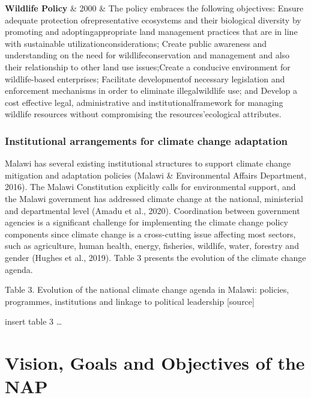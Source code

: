 \documentclass[
]{book}
\begin{document}
\begin{longtable}[]
\textbf{Wildlife Policy} & 2000 & The policy embraces the following objectives: Ensure adequate protection ofrepresentative ecosystems and their biological diversity by promoting and adoptingappropriate land management practices that are in line with sustainable utilizationconsiderations; Create public awareness and understanding on the need for wildlifeconservation and management and also their relationship to other land use issues;Create a conducive environment for wildlife-based enterprises; Facilitate developmentof necessary legislation and enforcement mechanisms in order to eliminate illegalwildlife use; and Develop a cost effective legal, administrative and institutionalframework for managing wildlife resources without compromising the resources'ecological attributes. \\
\bottomrule
\end{longtable}

\hypertarget{institutional-arrangements-for-climate-change-adaptation}{%
\subsection{Institutional arrangements for climate change adaptation}\label{institutional-arrangements-for-climate-change-adaptation}}

Malawi has several existing institutional structures to support climate change mitigation and adaptation policies (Malawi \& Environmental Affairs Department,
2016). The Malawi Constitution explicitly calls for environmental support, and the Malawi government has addressed climate change at the national, ministerial
and departmental level (Amadu et al., 2020). Coordination between government agencies is a significant challenge for implementing the climate change policy
components since climate change is a cross-cutting issue affecting most sectors, such as agriculture, human health, energy, fisheries, wildlife, water, forestry
and gender (Hughes et al., 2019). Table 3 presents the evolution of the climate change agenda.

Table 3. Evolution of the national climate change agenda in Malawi: policies, programmes, institutions and linkage to political leadership {[}source{]}

insert table 3 \ldots{}

\hypertarget{vision-goals-and-objectives-of-the-nap}{%
\chapter{Vision, Goals and Objectives of the NAP}\label{vision-goals-and-objectives-of-the-nap}}
\end{document}
